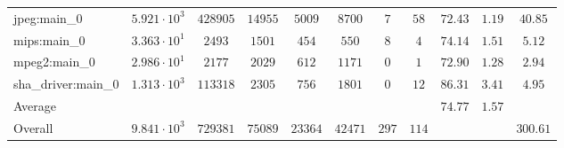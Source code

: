 \begin{tabular}{|l|c|c|c|c|c|c|c|c|c|c|}
jpeg:main\_0            & $ 5.921 \cdot 10^{3} $ & $ 428905 $ & $ 14955 $ & $ 5009  $ & $ 8700  $ & $ 7   $ & $ 58  $ & $ 72.43       $ & $ 1.19    $ & $ 40.85   $ \\
mips:main\_0            & $ 3.363 \cdot 10^{1} $ & $ 2493   $ & $ 1501  $ & $ 454   $ & $ 550   $ & $ 8   $ & $ 4   $ & $ 74.14       $ & $ 1.51    $ & $ 5.12    $ \\
mpeg2:main\_0           & $ 2.986 \cdot 10^{1} $ & $ 2177   $ & $ 2029  $ & $ 612   $ & $ 1171  $ & $ 0   $ & $ 1   $ & $ 72.90       $ & $ 1.28    $ & $ 2.94    $ \\
sha\_driver:main\_0     & $ 1.313 \cdot 10^{3} $ & $ 113318 $ & $ 2305  $ & $ 756   $ & $ 1801  $ & $ 0   $ & $ 12  $ & $ 86.31       $ & $ 3.41    $ & $ 4.95    $ \\
\hline
Average                 & $                    $ & $        $ & $       $ & $       $ & $       $ & $     $ & $     $ & $ 74.77       $ & $ 1.57    $ & $         $ \\
\hline
Overall                 & $ 9.841 \cdot 10^{3} $ & $ 729381 $ & $ 75089 $ & $ 23364 $ & $ 42471 $ & $ 297 $ & $ 114 $ & $             $ & $         $ & $ 300.61  $ \\
\hline
\end{tabular}
